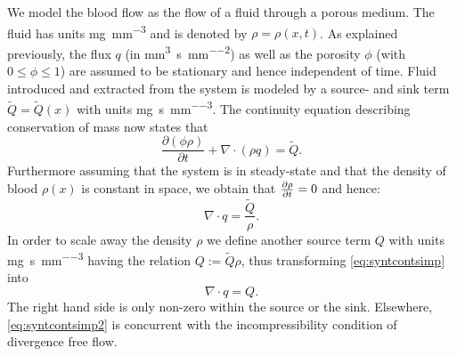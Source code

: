 \documentclass[paper=a4, fontsize=11pt,parskip=half,headings=small]{scrartcl}
\newcommand{\siq}{\cubic\milli\meter\per\second\per\square\milli\meter}
\newcommand{\siQ}{\milli\gram\per\second\per\cubic\milli\meter}
\newcommand{\sirho}{\milli\gram\per\cubic\milli\meter}
\begin{document}
	We model the blood flow as the flow of a fluid through a porous medium. 
	The fluid has units \si{\sirho} and is denoted by $\rho = \rho(x,t)$.
	As explained previously, the flux $q$ (in \si{\siq}) as well as the porosity $\phi$ (with $0 \le \phi \le 1$) are assumed to be stationary and hence independent of time.
	Fluid introduced and extracted from the system is modeled by a source- and sink term $\tilde{Q} = \tilde{Q}(x)$ with units \si{\siQ}. 
	The continuity equation describing conservation of mass now states that
	\begin{equation}
		\frac{\partial (\phi \rho)}{\partial t} + \nabla \cdot (\rho q) = \tilde{Q}.
		\label{eq:syntcont}
	\end{equation} 
	Furthermore assuming that the system is in steady-state and that the density of blood $\rho(x)$ is constant in space, we obtain that $\frac{\partial \rho}{\partial t} = 0$ and hence:
	\begin{equation}
		\nabla \cdot q = \frac{\tilde{Q}}{\rho}.
		\label{eq:syntcontsimp}
	\end{equation}
	In order to scale away the density $\rho$ we define another source term $Q$ with units \si{\siQ} having the relation $Q := \tilde{Q}\rho$, thus transforming \eqref{eq:syntcontsimp} into
	\begin{equation}
		\nabla \cdot q = Q.
		\label{eq:syntcontsimp2}
	\end{equation}
	The right hand side is only non-zero within the source or the sink. 
	Elsewhere, \eqref{eq:syntcontsimp2} is concurrent with the incompressibility condition of divergence free flow.
	
\end{document}

